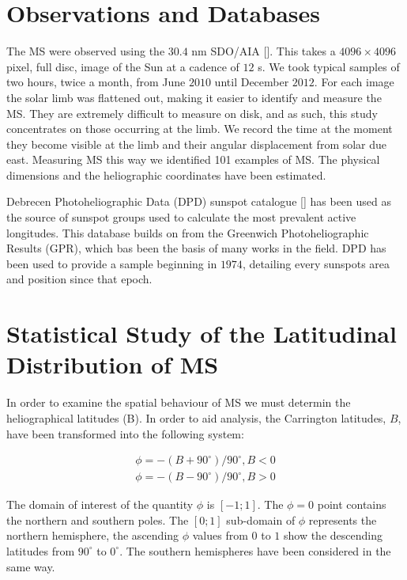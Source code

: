 \section{Observations and Databases}
The MS were observed using the $30.4$ nm SDO/AIA [\cite{AIAspec}]. 
This takes a $4096 \times 4096$ pixel, full disc, image of the Sun at a cadence of $12$ s. 
We took typical samples of two hours, twice a month, from June $2010$ until December $2012$.
For each image the solar limb was flattened out, making it easier to identify and measure the MS.
They are extremely difficult to measure on disk, and as such, this study concentrates on those occurring at the limb.
We record the time at the moment they become visible at the limb and their angular displacement from solar due east.
Measuring MS this way we identified 101 examples of MS. The physical dimensions and the heliographic coordinates have been estimated. 

Debrecen Photoheliographic Data (DPD) sunspot catalogue [\cite{Gyori2011}] has been used as the source of sunspot groups used to calculate the most prevalent active longitudes.
This database builds on from the Greenwich Photoheliographic Results (GPR), which bas been the basis of many works in the field.
DPD has been used to provide a sample beginning in $1974$, detailing every sunspots area and position since that epoch.

\section{Statistical Study of the Latitudinal Distribution of MS}
In order to examine the spatial behaviour of MS we must determin the heliographical latitudes (B).
In order to aid analysis, the Carrington latitudes, $B$, have been transformed into the following system:

\begin{equation}
\begin{split}
\phi=-(B+90^{\circ})/90^{\circ},  B<0 \\
\phi=-(B-90^{\circ})/90^{\circ},  B>0
\end{split}
\end{equation}

The domain of interest of the quantity $\phi$ is $[-1;1]$. 
The $\phi=0$ point contains the northern and southern poles.
The $[0;1]$ sub-domain of $\phi$ represents the northern hemisphere, the ascending $\phi$ values from $0$ to $1$ show the descending latitudes from $90^{\circ}$ to $0^{\circ}$. 
The southern hemispheres have been considered in the same way.


